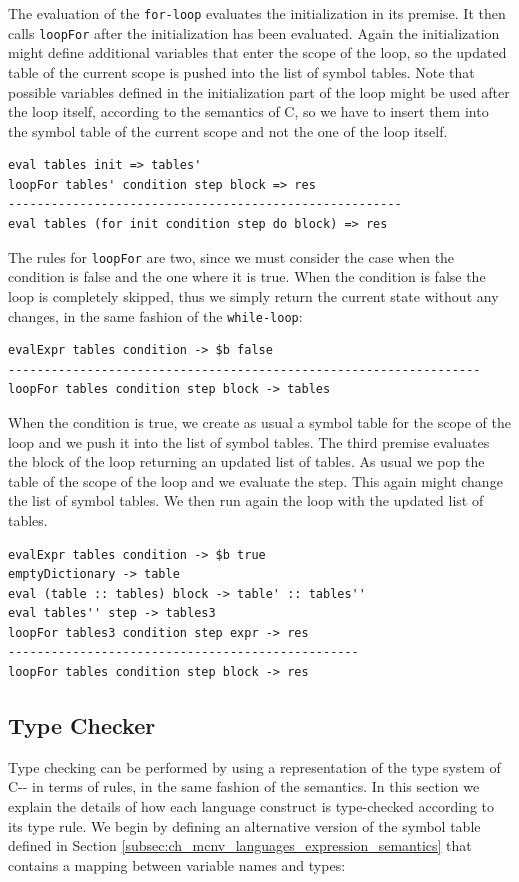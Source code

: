 \noindent
The evaluation of the \texttt{for-loop} evaluates the initialization in its premise. It then calls \texttt{loopFor} after the initialization has been evaluated. Again the initialization might define additional variables that enter the scope of the loop, so the updated table of the current scope is pushed into the list of symbol tables. Note that possible variables defined in the initialization part of the loop might be used after the loop itself, according to the semantics of C, so we have to insert them into the symbol table of the current scope and not the one of the loop itself.

\begin{lstlisting}
eval tables init => tables'
loopFor tables' condition step block => res
-------------------------------------------------------
eval tables (for init condition step do block) => res
\end{lstlisting}

The rules for \texttt{loopFor} are two, since we must consider the case when the condition is false and the one where it is true. When the condition is false the loop is completely skipped, thus we simply return the current state without any changes, in the same fashion of the \texttt{while-loop}:

\begin{lstlisting}
evalExpr tables condition -> $b false
------------------------------------------------------------------
loopFor tables condition step block -> tables
\end{lstlisting}

\noindent
When the condition is true, we create as usual a symbol table for the scope of the loop and we push it into the list of symbol tables. The third premise evaluates the block of the loop returning an updated list of tables. As usual we pop the table of the scope of the loop and we evaluate the step. This again might change the list of symbol tables. We then run again the loop with the updated list of tables.

\begin{lstlisting}
evalExpr tables condition -> $b true
emptyDictionary -> table
eval (table :: tables) block -> table' :: tables''
eval tables'' step -> tables3
loopFor tables3 condition step expr -> res 
-------------------------------------------------
loopFor tables condition step block -> res
\end{lstlisting}

\subsection{Type Checker}
\label{subsec:ch_mcnv_languages_type_checking}
Type checking can be performed by using a representation of the type system of C-{}- in terms of rules, in the same fashion of the semantics. In this section we explain the details of how each language construct is type-checked according to its type rule. We begin by defining an alternative version of the symbol table defined in Section \ref{subsec:ch_mcnv_languages_expression_semantics} that contains a mapping between variable names and types:

